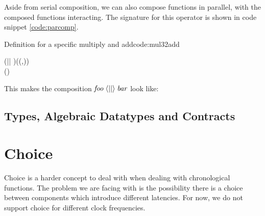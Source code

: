 Aside from serial composition, we can also compose functions in parallel, with the composed functions interacting. 
The signature for this operator is shown in code snippet \ref{code:parcomp}.
\begin{texexptitled}{Definition for a specific multiply and add}{code:mul32add}
\begin{hscode}\SaveRestoreHook
{}%
%
%
\>[B]{}(\langle || \rangle){}\<[9]%
\>[9]{}\mathbin{::}(\langle{}\rangle\to {}\langle{}\rangle\to (\langle{}\rangle,\langle{}\rangle)){}\<[E]%
\\
\>[9]{}\to (\langle{}\rangle\to {}\langle{}\rangle){}\<[E]%
\\
\>[9]{}\to {}\langle{}\rangle\to {}\langle{}\rangle{}\<[E]%
\ColumnHook
\end{hscode}\resethooks
\end{texexptitled}
This  makes the composition \ensuremath{\Varid{foo}\;\langle || \rangle\;\Varid{bar}} look like:
\begin{figure}[H]
\centering
\footnotesize
{}
\end{figure}

\subsection{Types, Algebraic Datatypes and Contracts}

\section{Choice}
Choice is a harder concept to deal with when dealing with chronological functions. 
The problem we are facing with is the possibility there is a choice between components which introduce different latencies.
For now, we do not support choice for different clock frequencies.

